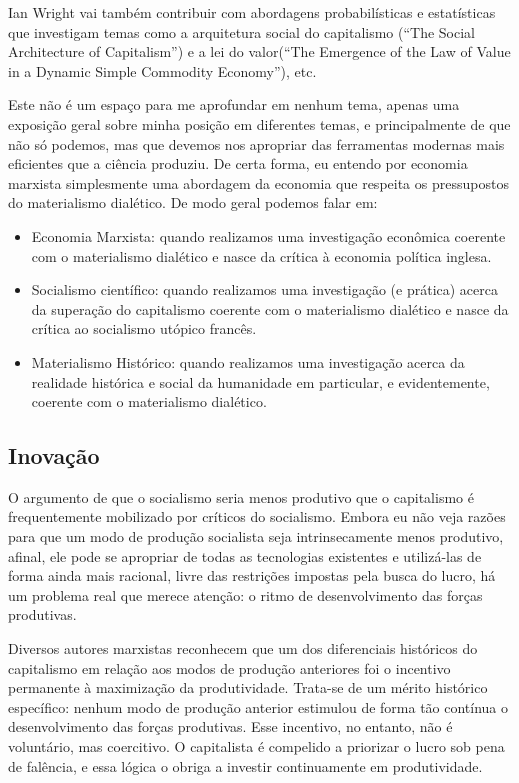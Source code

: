 Ian Wright vai também contribuir com abordagens probabilísticas e estatísticas que investigam temas como a arquitetura social do capitalismo (“The Social Architecture of Capitalism”) e a lei do valor(“The Emergence of the Law of Value in a Dynamic Simple Commodity Economy”), etc.

Este não é um espaço para me aprofundar em nenhum tema, apenas uma exposição geral sobre minha posição em diferentes temas, e principalmente de que não só podemos, mas que devemos nos apropriar das ferramentas modernas mais eficientes que a ciência produziu. De certa forma, eu entendo por economia marxista simplesmente uma abordagem da economia que respeita os pressupostos do materialismo dialético. De modo geral podemos falar em:

\begin{itemize}
    \item Economia Marxista: quando realizamos uma investigação econômica coerente com o materialismo dialético e nasce da crítica à economia política inglesa.
    \item Socialismo científico: quando realizamos uma investigação (e prática) acerca da superação do capitalismo coerente com o materialismo dialético e nasce da crítica ao socialismo utópico francês.
    \item Materialismo Histórico: quando realizamos uma investigação acerca da realidade histórica e social da humanidade em particular, e evidentemente, coerente com o materialismo dialético.
\end{itemize}

\subsection{Inovação}

O argumento de que o socialismo seria menos produtivo que o capitalismo é frequentemente mobilizado por críticos do socialismo. Embora eu não veja razões para que um modo de produção socialista seja intrinsecamente menos produtivo, afinal, ele pode se apropriar de todas as tecnologias existentes e utilizá-las de forma ainda mais racional, livre das restrições impostas pela busca do lucro, há um problema real que merece atenção: o ritmo de desenvolvimento das forças produtivas.

Diversos autores marxistas reconhecem que um dos diferenciais históricos do capitalismo em relação aos modos de produção anteriores foi o incentivo permanente à maximização da produtividade. Trata-se de um mérito histórico específico: nenhum modo de produção anterior estimulou de forma tão contínua o desenvolvimento das forças produtivas. Esse incentivo, no entanto, não é voluntário, mas coercitivo. O capitalista é compelido a priorizar o lucro sob pena de falência, e essa lógica o obriga a investir continuamente em produtividade.

